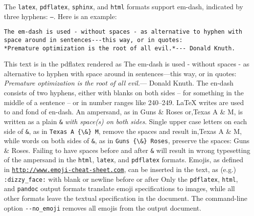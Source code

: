 \documentclass[%
oneside,                 %
final,                   %
10pt]{article}
\begin{document}
The \texttt{latex}, \texttt{pdflatex}, \texttt{sphinx}, and \texttt{html} formats support em-dash,
indicated by three hyphens: \texttt{---}. Here is an example:
\begin{Verbatim}[numbers=none,fontsize=\fontsize{9pt}{9pt},baselinestretch=0.95,xleftmargin=2mm]
The em-dash is used - without spaces - as alternative to hyphen with
space around in sentences---this way, or in quotes:
*Premature optimization is the root of all evil.*--- Donald Knuth.

\end{Verbatim}

This text is in the pdflatex rendered as
The em-dash is used - without spaces - as alternative to hyphen with
space around in sentences---this way, or in quotes:
\emph{Premature optimization is the root of all evil.}--- Donald Knuth.
The en-dash consists of two hyphens, either with blanks on both sides -- for
something in the middle of a sentence -- or in number ranges like 240--249.
{\LaTeX} writes are used to and fond of en-dash.
An ampersand, as in Guns {\&} Roses or,Texas A {\&} M, is written as a
plain \Verb!&! \emph{with space(s) on both sides}. Single upper case letters on each
side of \Verb!&!, as in \Verb!Texas A {\&} M!, remove the spaces and result in,Texas A {\&} M, while words on both sides of \Verb!&!, as in \Verb!Guns {\&} Roses!,
preserve the spaces: Guns {\&} Roses. Failing to have spaces before and
after \Verb!&! will result in wrong typesetting of the ampersand in the \texttt{html},
\texttt{latex}, and \texttt{pdflatex} formats.
Emojis, as defined in \href{{http://www.emoji-cheat-sheet.com}}{\nolinkurl{http://www.emoji-cheat-sheet.com}}, can be
inserted in the text, as (e.g.) \Verb!:dizzy_face:! with blank or newline
before or after  Only the \texttt{pdflatex}, \texttt{html}, and \texttt{pandoc} output
formats translate emoji specifications to images, while all other
formats leave the textual specification in the document. The
command-line option \Verb!--no_emoji! removes all emojis from the output
document.
\end{document}
